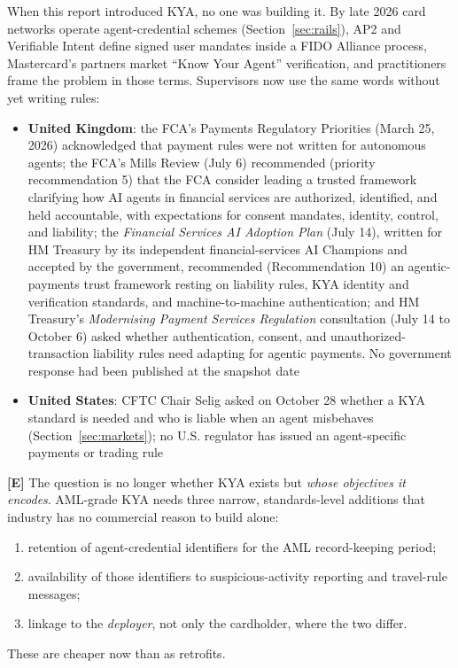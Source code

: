 \documentclass[11pt,letterpaper]{article}
\begin{document}
\begin{infobox}
When this report introduced KYA, no one was building it. By late 2026 card networks operate agent-credential schemes (Section~\ref{sec:rails}), AP2 and Verifiable Intent define signed user mandates inside a FIDO Alliance process, Mastercard's partners market ``Know Your Agent'' verification, and practitioners frame the problem in those terms. Supervisors now use the same words without yet writing rules:
\begin{itemize}
  \item \textbf{United Kingdom}: the FCA's Payments Regulatory Priorities (March 25, 2026) acknowledged that payment rules were not written for autonomous agents; the FCA's Mills Review (July 6) recommended (priority recommendation 5) that the FCA consider leading a trusted framework clarifying how AI agents in financial services are authorized, identified, and held accountable, with expectations for consent mandates, identity, control, and liability; the \textit{Financial Services AI Adoption Plan} (July 14), written for HM Treasury by its independent financial-services AI Champions and accepted by the government, recommended (Recommendation 10) an agentic-payments trust framework resting on liability rules, KYA identity and verification standards, and machine-to-machine authentication; and HM Treasury's \textit{Modernising Payment Services Regulation} consultation (July 14 to October 6) asked whether authentication, consent, and unauthorized-transaction liability rules need adapting for agentic payments. No government response had been published at the snapshot date
  \item \textbf{United States}: CFTC Chair Selig asked on October 28 whether a KYA standard is needed and who is liable when an agent misbehaves (Section~\ref{sec:markets}); no U.S. regulator has issued an agent-specific payments or trading rule
\end{itemize}

\textbf{[E]} The question is no longer whether KYA exists but \textit{whose objectives it encodes}. AML-grade KYA needs three narrow, standards-level additions that industry has no commercial reason to build alone:
\begin{enumerate}
  \item retention of agent-credential identifiers for the AML record-keeping period;
  \item availability of those identifiers to suspicious-activity reporting and travel-rule messages;
  \item linkage to the \textit{deployer}, not only the cardholder, where the two differ.
\end{enumerate}
These are cheaper now than as retrofits.
\end{infobox}
\end{document}
